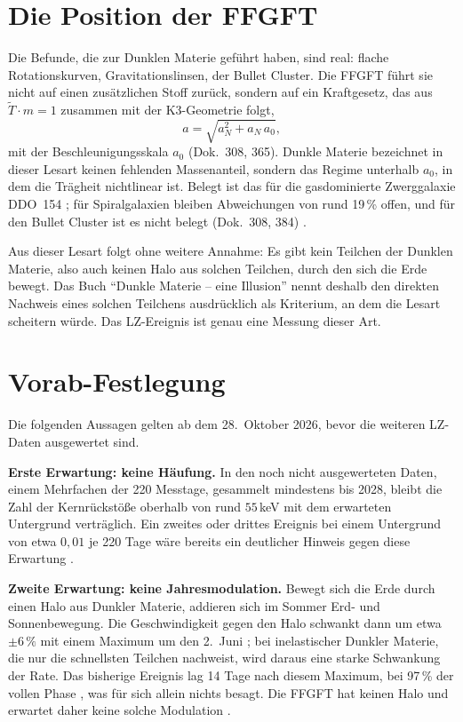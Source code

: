 \section{Die Position der FFGFT}

Die Befunde, die zur Dunklen Materie geführt haben, sind real: flache Rotationskurven,
Gravitationslinsen, der Bullet Cluster. Die FFGFT führt sie nicht auf einen zusätzlichen Stoff
zurück, sondern auf ein Kraftgesetz, das aus $\tilde T\cdot m=1$ zusammen mit der K3-Geometrie folgt,
\[
  a=\sqrt{a_N^2+a_N\,a_0},
\]
mit der Beschleunigungsskala $a_0$ (Dok.~308, 365). Dunkle Materie bezeichnet in dieser Lesart
keinen fehlenden Massenanteil, sondern das Regime unterhalb $a_0$, in dem die Trägheit nichtlinear
ist. Belegt ist das für die gasdominierte Zwerggalaxie DDO~154 \KM; für Spiralgalaxien bleiben
Abweichungen von rund 19\,\% offen, und für den Bullet Cluster ist es nicht belegt (Dok.~308, 384)
\SM.

Aus dieser Lesart folgt ohne weitere Annahme: Es gibt kein Teilchen der Dunklen Materie, also auch
keinen Halo aus solchen Teilchen, durch den sich die Erde bewegt. Das Buch \enquote{Dunkle Materie
-- eine Illusion} nennt deshalb den direkten Nachweis eines solchen Teilchens ausdrücklich als
Kriterium, an dem die Lesart scheitern würde. Das LZ-Ereignis ist genau eine Messung dieser Art.

\section{Vorab-Festlegung}

Die folgenden Aussagen gelten ab dem 28.~Oktober 2026, bevor die weiteren LZ-Daten ausgewertet sind.

\textbf{Erste Erwartung: keine Häufung.} In den noch nicht ausgewerteten Daten, einem Mehrfachen der
220 Messtage, gesammelt mindestens bis 2028, bleibt die Zahl der Kernrückstöße oberhalb von rund
$55$\,keV mit dem erwarteten Untergrund verträglich. Ein zweites oder drittes Ereignis bei einem
Untergrund von etwa $0{,}01$ je 220 Tage wäre bereits ein deutlicher Hinweis gegen diese Erwartung
\SM.

\textbf{Zweite Erwartung: keine Jahresmodulation.} Bewegt sich die Erde durch einen Halo aus
Dunkler Materie, addieren sich im Sommer Erd- und Sonnenbewegung. Die Geschwindigkeit gegen den Halo
schwankt dann um etwa $\pm6\,\%$ mit einem Maximum um den 2.~Juni \KM; bei inelastischer Dunkler
Materie, die nur die schnellsten Teilchen nachweist, wird daraus eine starke Schwankung der Rate.
Das bisherige Ereignis lag 14 Tage nach diesem Maximum, bei 97\,\% der vollen Phase \KM, was für
sich allein nichts besagt. Die FFGFT hat keinen Halo und erwartet daher keine solche Modulation \SM.

